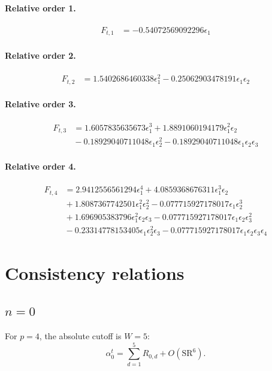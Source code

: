 \documentclass[10pt]{article}
\begin{document}
\paragraph{Relative order 1.}
\begin{align*}
F_{t,1} &=  - 0.54072569092296 \epsilon_{1}
\end{align*}

\paragraph{Relative order 2.}
\begin{align*}
F_{t,2} &= 1.5402686460338 \epsilon_{1}^{2} - 0.25062903478191 \epsilon_{1} \epsilon_{2}
\end{align*}

\paragraph{Relative order 3.}
\begin{align*}
F_{t,3} &= 1.6057835635673 \epsilon_{1}^{3} + 1.8891060194179 \epsilon_{1}^{2} \epsilon_{2} \\
&{}  - 0.18929040711048 \epsilon_{1} \epsilon_{2}^{2} - 0.18929040711048 \epsilon_{1} \epsilon_{2} \epsilon_{3}
\end{align*}

\paragraph{Relative order 4.}
\begin{align*}
F_{t,4} &= 2.9412556561294 \epsilon_{1}^{4} + 4.0859368676311 \epsilon_{1}^{3} \epsilon_{2} \\
&{}  + 1.8087367742501 \epsilon_{1}^{2} \epsilon_{2}^{2} - 0.077715927178017 \epsilon_{1} \epsilon_{2}^{3} \\
&{}  + 1.696905383796 \epsilon_{1}^{2} \epsilon_{2} \epsilon_{3} - 0.077715927178017 \epsilon_{1} \epsilon_{2} \epsilon_{3}^{2} \\
&{}  - 0.23314778153405 \epsilon_{1} \epsilon_{2}^{2} \epsilon_{3} - 0.077715927178017 \epsilon_{1} \epsilon_{2} \epsilon_{3} \epsilon_{4}
\end{align*}

\section{Consistency relations}
\subsection{$n=0$}
For $p=4$, the absolute cutoff is $W=5$:
\[\alpha_{0}^t=\sum_{d=1}^{5}R_{0,d}+O(\mathrm{SR}^{6}).\]
\end{document}
